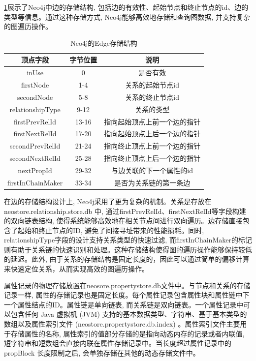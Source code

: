 \cref{tab:neo4j-edge}展示了Neo4j中边的存储结构, 包括边的有效性、起始节点和终止节点的id、边的类型等信息。通过这种存储方式, Neo4j能够高效地存储和查询图数据, 并支持复杂的图遍历操作。\begin{table}[H]
	\centering
	\caption{Neo4j的Edge存储结构}
	\begin{tabular}{|c|c|c|}
		\hline
		顶点字段              & 字节位置  & 说明             \\
		\hline
		inUse             & 0     & 是否有效           \\
		firstNode         & 1-4   & 关系的起始节点id      \\
		secondNode        & 5-8   & 关系的终止节点id      \\
		relationshipType           & 9-12  & 关系的类型          \\
		firstPrevRelId     & 13-16 & 指向起始顶点上前一个边的指针 \\
		firstNextRelId     & 17-20 & 指向起始顶点上后一个边的指针 \\
		secondPrevRelId      & 21-24 & 指向终止顶点上前一个边的指针 \\
		secondNextRelId      & 25-28 & 指向终止顶点上后一个边的指针 \\
		nextPropId         & 29-32 & 与边关联的下一个属性的id    \\
		firstInChainMaker & 33-34 & 是否为关系链的第一条边    \\
		\hline
	\end{tabular}
	\label{tab:neo4j-edge}
\end{table}
在边的存储结构设计上, Neo4j采用了更为复杂的机制。关系是存放在 \\ neostore.relationship.store.db 中, 通过firstPrevRelId、firstNextRelId等字段构建的双向链表结构, 使得系统能够高效地在相关节点间进行双向遍历。边存储直接包含了起始和终止节点的ID, 避免了间接寻址带来的性能损耗。同时, relationshipType字段的设计支持关系类型的快速过滤, 而firstInChainMaker的标记则有助于关系链的快速识别和处理。这种存储结构使得图的遍历操作能够保持较低的延迟。此外, 由于关系的存储结构是固定长度的，因此可以通过简单的偏移计算来快速定位关系，从而实现高效的图遍历操作。


属性记录的物理存储放置在neosore.propertystore.db文件中。与节点和关系的存储记录一样, 属性的存储记录也是固定长度。每个属性记录包含属性块和属性链中下一个属性结点的ID。属性链是单向链表, 而关系链是双向链表。一个属性记录中可以包含任何 Java 虚拟机 (JVM) 支持的基本数据类型、字符串、基于基本类型的数组以及属性索引文件 (neostore.propertystore.db.index) 。属性索引文件主要用于存储属性的名称, 属性索引的值部分存储的是指向动态内存的记录或者内联值, 短字符串和短数组会直接内联在属性存储记录中。当长度超过属性记录中的 propBlock 长度限制之后, 会单独存储在其他的动态存储文件中。


